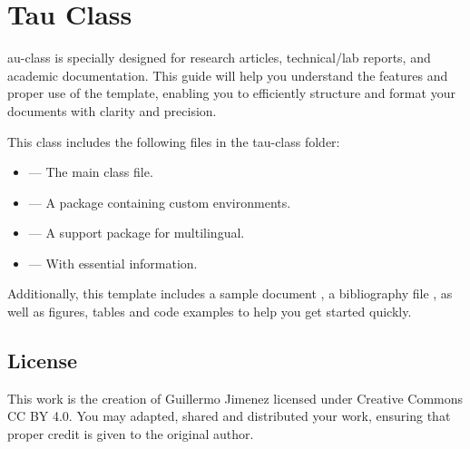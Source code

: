 
\section{Tau Class}

    au-class is specially designed for research articles, technical/lab reports, and academic documentation. This guide will help you understand the features and proper use of the template, enabling you to efficiently structure and format your documents with clarity and precision.

    This class includes the following files in the tau-class folder:
	
	\begin{itemize}
		\item {} — The main class file.
		\item {} — A package containing custom environments.
		\item {} — A support package for multilingual.
		\item {} — With essential information.
	\end{itemize}

    Additionally, this template includes a sample document , a bibliography file , as well as figures, tables and code examples to help you get started quickly.

    \subsection{License}
    
        This work is the creation of Guillermo Jimenez licensed under Creative Commons CC BY 4.0. You may adapted, shared and distributed your work, ensuring that proper credit is given to the original author.


